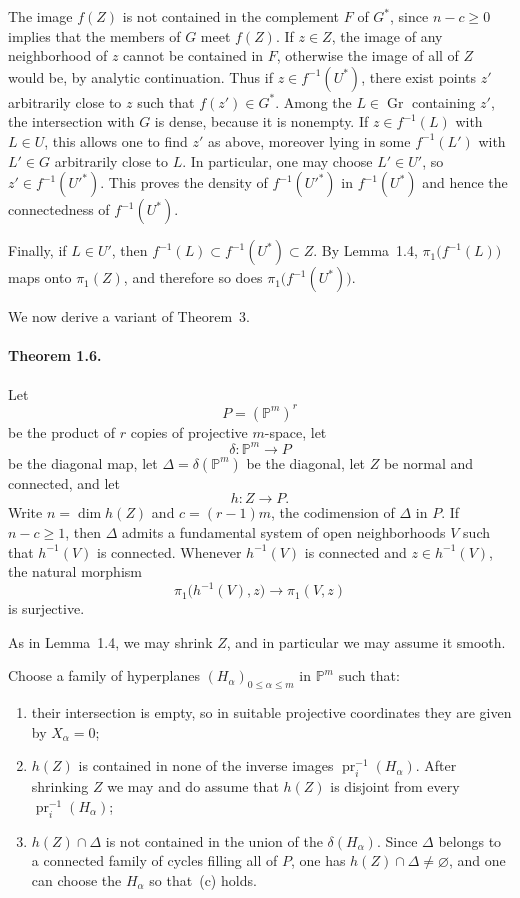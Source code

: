 \documentclass[11pt]{amsart}
\newcommand{\PP}{\mathbb{P}}
\newcommand{\DeltaDiag}{\Delta}
\begin{document}
The image $f(Z)$ is not contained in the complement $F$ of $G^*$, since $n-c\ge 0$ implies that the members of $G$ meet $f(Z)$. If $z\in Z$, the image of any neighborhood of $z$ cannot be contained in $F$, otherwise the image of all of $Z$ would be, by analytic continuation. Thus if $z\in f^{-1}(U^*)$, there exist points $z'$ arbitrarily close to $z$ such that $f(z')\in G^*$. Among the $L\in \operatorname{Gr}$ containing $z'$, the intersection with $G$ is dense, because it is nonempty. If $z\in f^{-1}(L)$ with $L\in U$, this allows one to find $z'$ as above, moreover lying in some $f^{-1}(L')$ with $L'\in G$ arbitrarily close to $L$. In particular, one may choose $L'\in U'$, so $z'\in f^{-1}(U'^*)$. This proves the density of $f^{-1}(U'^*)$ in $f^{-1}(U^*)$ and hence the connectedness of $f^{-1}(U^*)$.

Finally, if $L\in U'$, then $f^{-1}(L)\subset f^{-1}(U^*)\subset Z$. By Lemma~1.4, $\pi_1\bigl(f^{-1}(L)\bigr)$ maps onto $\pi_1(Z)$, and therefore so does $\pi_1\bigl(f^{-1}(U^*)\bigr)$.

We now derive a variant of Theorem~3.

\paragraph{\textbf{Theorem 1.6.}}
Let
\[
P=(\PP^m)^r
\]
be the product of $r$ copies of projective $m$-space, let
\[
\delta\colon \PP^m\to P
\]
be the diagonal map, let $\DeltaDiag=\delta(\PP^m)$ be the diagonal, let $Z$ be normal and connected, and let
\[
h\colon Z\to P.
\]
Write $n=\dim h(Z)$ and $c=(r-1)m$, the codimension of $\DeltaDiag$ in $P$. If $n-c\ge 1$, then $\DeltaDiag$ admits a fundamental system of open neighborhoods $V$ such that $h^{-1}(V)$ is connected. Whenever $h^{-1}(V)$ is connected and $z\in h^{-1}(V)$, the natural morphism
\[
\pi_1\bigl(h^{-1}(V),z\bigr)\to \pi_1(V,z)
\]
is surjective.

As in Lemma~1.4, we may shrink $Z$, and in particular we may assume it smooth.

Choose a family of hyperplanes $(H_\alpha)_{0\le \alpha\le m}$ in $\PP^m$ such that:
\begin{enumerate}[label=(\alph*)]
\item their intersection is empty, so in suitable projective coordinates they are given by $X_\alpha=0$;
\item $h(Z)$ is contained in none of the inverse images $\operatorname{pr}_i^{-1}(H_\alpha)$. After shrinking $Z$ we may and do assume that $h(Z)$ is disjoint from every $\operatorname{pr}_i^{-1}(H_\alpha)$;
\item $h(Z)\cap \DeltaDiag$ is not contained in the union of the $\delta(H_\alpha)$. Since $\DeltaDiag$ belongs to a connected family of cycles filling all of $P$, one has $h(Z)\cap \DeltaDiag\neq\varnothing$, and one can choose the $H_\alpha$ so that~(c) holds.
\end{enumerate}
\end{document}

